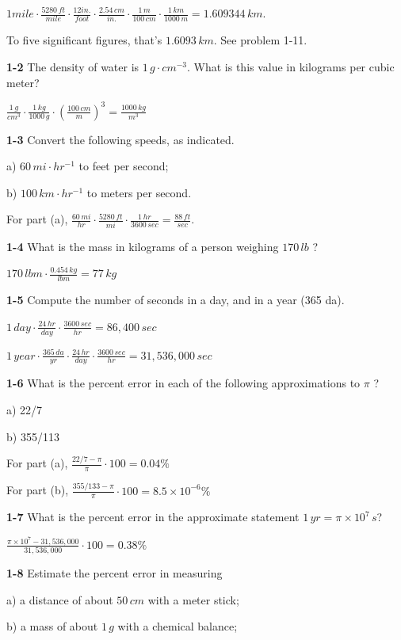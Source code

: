 \documentclass{amsart}
\begin{document}
$1 mile \cdot \frac{5280 \, ft}{mile} \cdot \frac{12 in.}{foot} \cdot \frac{2.54 \, cm}{in.} \cdot
\frac{1 \, m}{100 \, cm} \cdot \frac{1 \, km}{1000 \, m} = 1.609344 \, km$.

To five significant figures, that's $1.6093 \, km$.  See problem 1-11.

\textbf{1-2} The density of water is $1 \, g \cdot cm^{-3}$.
What is this value in kilograms per cubic meter?

$\frac{1 \, g}{cm^{3}} \cdot \frac{1 \, kg}{1000 \, g} \cdot {\left( \frac{100 \, cm}{m} \right)}^{3}
= \frac{1000 \, kg}{m^{3}}$

\textbf{1-3} Convert the following speeds, as indicated.

a) $60 \, mi \cdot hr^{-1}$ to feet per second;

b) $100 \, km \cdot hr^{-1}$ to meters per second.

For part (a), $\frac{60 \, mi}{hr} \cdot \frac{5280 \, ft}{mi} \cdot \frac{1 \, hr}{3600 \, sec}
= \frac{88 \, ft}{sec}$.

\textbf{1-4} What is the mass in kilograms  of a person weighing $170 \, lb$ ?

$170 \, lbm \cdot \frac{0.454 \, kg}{lbm} = 77 \, kg$

\textbf{1-5} Compute the number of seconds in a day, and in a year (365 da).

$1 \, day \cdot \frac{24 \, hr}{day} \cdot \frac{3600 \, sec}{hr} = 86,400 \, sec$

$1 \, year \cdot \frac{365 \, da}{yr} \cdot \frac{24 \, hr}{day} \cdot \frac{3600 \, sec}{hr}
= 31,536,000 \, sec$

\textbf{1-6} What is the percent error in each of the following approximations to $\pi$ ?

a) 22/7

b) 355/113

For part (a), $\frac{22/7-\pi}{\pi} \cdot 100 = 0.04\%$

For part (b), $\frac{355/133 - \pi}{\pi} \cdot 100 = 8.5 \times 10^{-6}\%$

\textbf{1-7} What is the percent error in the approximate statement $1\,yr = \pi \times 10^{7}\,s$?

$\frac{\pi \times 10^{7} - 31,536,000}{31,536,000} \cdot 100 = 0.38\%$

\textbf{1-8} Estimate the percent error in measuring

a) a distance of about $50\,cm$ with a meter stick;

b) a mass of about $1\,g$ with a chemical balance;
\end{document}
